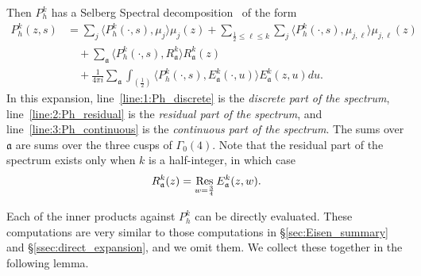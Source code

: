 Then $P_h^k$ has a Selberg Spectral decomposition~\cite{IwaniecKowalski04,
Goldfeld2006automorphic} of the form
\begin{align}
  P_h^k(z,s) &= \sum_j \langle P_h^k(\cdot, s), \mu_j \rangle \mu_j(z) + \sum_{\frac{1}{2}
  \leq \ell \leq k} \sum_j \langle P_h^k(\cdot, s), \mu_{j, \ell}\rangle \mu_{j, \ell}(z)
  \label{line:1:Ph_discrete} \\
  &\quad + \sum_{\mathfrak{a}} \langle P_h^k(\cdot, s), R^k_{\mathfrak{a}} \rangle
  R^k_{\mathfrak{a}}(z) \label{line:2:Ph_residual} \\
  &\quad + \frac{1}{4\pi i} \sum_{\mathfrak{a}} \int_{(\frac{1}{2})} \langle P_h^k(\cdot,
  s), E_{\mathfrak{a}}^k (\cdot, u)\rangle E_{\mathfrak{a}}^k (z, u) du.
  \label{line:3:Ph_continuous}
\end{align}
In this expansion, line~\eqref{line:1:Ph_discrete} is the \emph{discrete part of the
spectrum}, line~\eqref{line:2:Ph_residual} is the \emph{residual part of the spectrum},
and line~\eqref{line:3:Ph_continuous} is the \emph{continuous part of the spectrum}.
The sums over $\mathfrak{a}$ are sums over the three cusps of $\Gamma_0(4)$.
Note that the residual part of the spectrum exists only when $k$ is a half-integer, in
which case
\begin{equation}\label{eq:hyp:residual_spec_def}
  R_{\mathfrak{a}}^k(z) = \operatorname*{Res}_{w = \frac{3}{4}} E_{\mathfrak{a}}^k(z, w).
\end{equation}


Each of the inner products against $P_h^k$ can be directly evaluated.
These computations are very similar to those computations in \S\ref{sec:Eisen_summary} and
\S\ref{ssec:direct_expansion}, and we omit them.
We collect these together in the following lemma.


